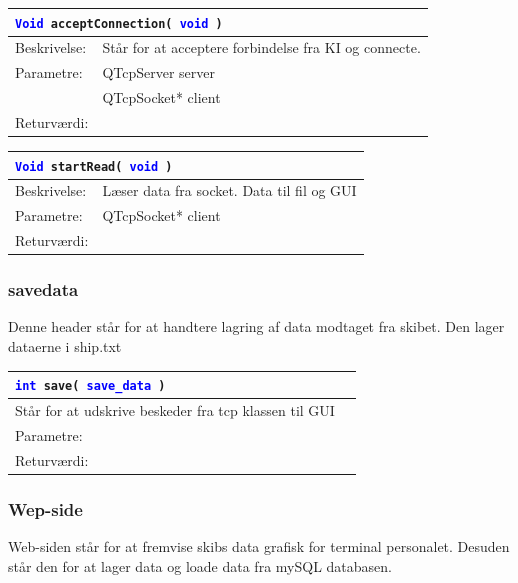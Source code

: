 \begin{table}[H]
\begin{tabular}{l p{12.5cm}}
\multicolumn{2}{l}{\texttt{\textcolor{blue}{Void} acceptConnection( \textcolor{blue}{void} )}} \\
\hline
Beskrivelse:&Står for at acceptere forbindelse fra KI og connecte.\\
Parametre:&QTcpServer server\\
				&QTcpSocket* client\\
Returværdi:&\\
\end{tabular}
\end{table}

\begin{table}[H]
\begin{tabular}{l p{12.5cm}}
\multicolumn{2}{l}{\texttt{\textcolor{blue}{Void} startRead( \textcolor{blue}{void} )}} \\
\hline
Beskrivelse:&Læser data fra socket. Data til fil og GUI\\
Parametre:&QTcpSocket* client\\
Returværdi:&\\
\end{tabular}
\end{table}

\subsubsection{savedata}
Denne header står for at handtere lagring af data modtaget fra skibet. Den lager dataerne i ship.txt

\begin{table}[H]
\begin{tabular}{l p{12.5cm}}
\multicolumn{2}{l}{\texttt{\textcolor{blue}{int} save( \textcolor{blue}{save\_data} )}} \\
\hline
Står for at udskrive beskeder fra tcp klassen til GUI \\
Parametre: \\
Returværdi:&\\
\end{tabular}
\end{table}

\subsubsection{Wep-side}
Web-siden står for at fremvise skibs data grafisk for terminal personalet. Desuden står den for at lager data og loade data fra mySQL databasen.\\

